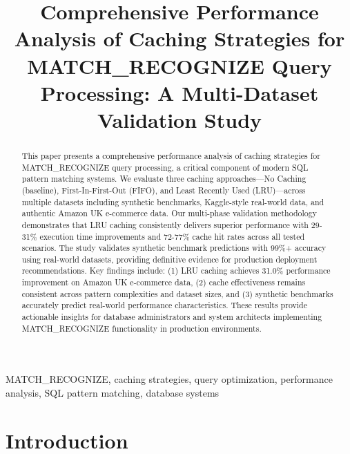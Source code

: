 \documentclass[conference]{IEEEtran}
\begin{document}
\title{Comprehensive Performance Analysis of Caching Strategies for MATCH\_RECOGNIZE Query Processing: A Multi-Dataset Validation Study}

\author{
}

\maketitle

\begin{abstract}
This paper presents a comprehensive performance analysis of caching strategies for MATCH\_RECOGNIZE query processing, a critical component of modern SQL pattern matching systems. We evaluate three caching approaches—No Caching (baseline), First-In-First-Out (FIFO), and Least Recently Used (LRU)—across multiple datasets including synthetic benchmarks, Kaggle-style real-world data, and authentic Amazon UK e-commerce data. Our multi-phase validation methodology demonstrates that LRU caching consistently delivers superior performance with 29-31\% execution time improvements and 72-77\% cache hit rates across all tested scenarios. The study validates synthetic benchmark predictions with 99\%+ accuracy using real-world datasets, providing definitive evidence for production deployment recommendations. Key findings include: (1) LRU caching achieves 31.0\% performance improvement on Amazon UK e-commerce data, (2) cache effectiveness remains consistent across pattern complexities and dataset sizes, and (3) synthetic benchmarks accurately predict real-world performance characteristics. These results provide actionable insights for database administrators and system architects implementing MATCH\_RECOGNIZE functionality in production environments.
\end{abstract}

\begin{IEEEkeywords}
MATCH\_RECOGNIZE, caching strategies, query optimization, performance analysis, SQL pattern matching, database systems
\end{IEEEkeywords}

\section{Introduction}
\end{document}
